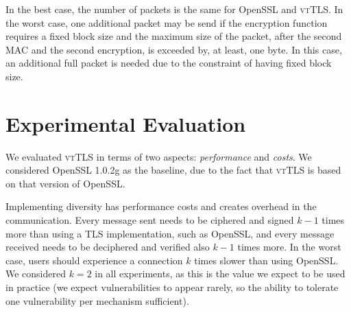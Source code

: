 \documentclass{sig-alternate-05-2015}
\begin{document}


In the best case, the number of packets is the same for OpenSSL and \textsc{vtTLS}. In the worst case, one additional packet may be send if the encryption function requires a fixed block size and the maximum size of the packet, after the second MAC and the second encryption, is exceeded by, at least, one byte. In this case, an additional full packet is needed due to the constraint of having fixed block size.





\section{Experimental Evaluation}
\label{sec-evaluation}

We evaluated \textsc{vtTLS} in terms of two aspects: \textit{performance} and \textit{costs}.
We considered OpenSSL 1.0.2g as the baseline, due to the fact that \textsc{vtTLS} is based on that version of OpenSSL.

Implementing diversity has performance costs and creates overhead in the communication. Every message sent needs to be ciphered and signed $k - 1$ times more than using a TLS implementation, such as OpenSSL, and every message received needs to be deciphered and verified also $k - 1$ times more. In the worst case, users should experience a connection $k$ times slower than using OpenSSL. We considered $k=2$ in all experiments, as this is the value we expect to be used in practice (we expect vulnerabilities to appear rarely, so the ability to tolerate one vulnerability per mechanism sufficient).
\end{document}
